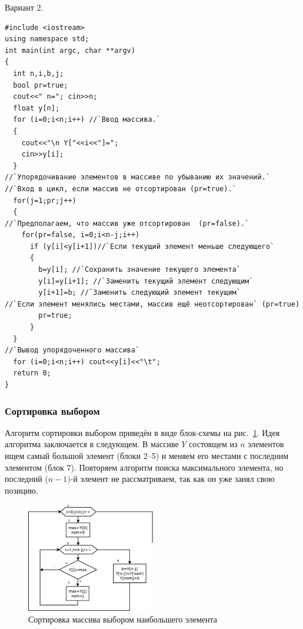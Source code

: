 Вариант 2.
\begin{lstlisting}
#include <iostream>
using namespace std;
int main(int argc, char **argv)
{
  int n,i,b,j;
  bool pr=true;
  cout<<" n="; cin>>n;
  float y[n];
  for (i=0;i<n;i++) //`Ввод массива.`
  {
    cout<<"\n Y["<<i<<"]=";
    cin>>y[i];
  }
//`Упорядочивание элементов в массиве по убыванию их значений.`
//`Вход в цикл, если массив не отсортирован (pr=true).`
  for(j=1;pr;j++)
  {
//`Предполагаем, что массив уже отсортирован  (pr=false).`
    for(pr=false, i=0;i<n-j;i++)
      if (y[i]<y[i+1])//`Если текущий элемент меньше следующего`
      {
        b=y[i]; //`Сохранить значение текущего элемента`
        y[i]=y[i+1]; //`Заменить текущий элемент следующим`
        y[i+1]=b; //`Заменить следующий элемент текущим`
//`Если элемент менялись местами, массив ещё неотсортирован` (pr=true)
        pr=true;
      }
  }
//`Вывод упорядоченного массива`
  for (i=0;i<n;i++) cout<<y[i]<<"\t";
  return 0;
}
\end{lstlisting}

\subsubsection[Сортировка выбором]{Сортировка выбором}
Алгоритм сортировки выбором приведён в виде блок-схемы на рис.~\ref{ch05:refDrawing12}. Идея алгоритма заключается в
следующем. В массиве $Y$ состоящем из $n$ элементов ищем самый большой элемент (блоки
2--5) и меняем его местами с последним элементом (блок 7). Повторяем алгоритм поиска максимального элемента, но
последний ($n-1)$-й элемент не рассматриваем, так как он уже занял свою позицию. 

\begin{figure}[htb]
\begin{center}
\includegraphics[width=0.5\textwidth]{img/ris_5_13}
\caption{Сортировка массива выбором наибольшего элемента}
\label{ch05:refDrawing12}
\end{center}
\end{figure}

